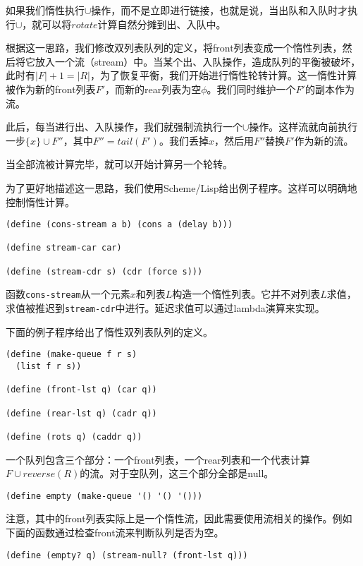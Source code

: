 \documentclass[UTF8]{article}
\begin{document}
如果我们惰性执行$\cup$操作，而不是立即进行链接，也就是说，当出队和入队时才执行$\cup$，就可以将$rotate$计算自然分摊到出、入队中。

根据这一思路，我们修改双列表队列的定义，将front列表变成一个惰性列表，然后将它放入一个流（stream）中\cite{SICP}。当某个出、入队操作，造成队列的平衡被破坏，此时有$|F| + 1 = |R|$，为了恢复平衡，我们开始进行惰性轮转计算。这一惰性计算被作为新的front列表$F'$，而新的rear列表为空$\phi$。我们同时维护一个$F'$的副本作为流。

此后，每当进行出、入队操作，我们就强制流执行一个$\cup$操作。这样流就向前执行一步$ \{ x \} \cup F''$，其中$F'' = tail(F')$。我们丢掉$x$，然后用$F''$替换$F'$作为新的流。

当全部流被计算完毕，就可以开始计算另一个轮转。

为了更好地描述这一思路，我们使用Scheme/Lisp给出例子程序。这样可以明确地控制惰性计算。

\lstset{language=Lisp}
\begin{lstlisting}
(define (cons-stream a b) (cons a (delay b)))

(define stream-car car)

(define (stream-cdr s) (cdr (force s)))
\end{lstlisting}

函数\texttt{cons-stream}从一个元素$x$和列表$L$构造一个惰性列表。它并不对列表$L$求值，求值被推迟到\texttt{stream-cdr}中进行。延迟求值可以通过lambda演算来实现\cite{SICP}。

下面的例子程序给出了惰性双列表队列的定义。

\lstset{language=Lisp}
\begin{lstlisting}
(define (make-queue f r s)
  (list f r s))

(define (front-lst q) (car q))

(define (rear-lst q) (cadr q))

(define (rots q) (caddr q))
\end{lstlisting}

一个队列包含三个部分：一个front列表，一个rear列表和一个代表计算$F \cup reverse(R)$的流。对于空队列，这三个部分全部是null。

\begin{lstlisting}
(define empty (make-queue '() '() '()))
\end{lstlisting}

注意，其中的front列表实际上是一个惰性流，因此需要使用流相关的操作。例如下面的函数通过检查front流来判断队列是否为空。

\begin{lstlisting}
(define (empty? q) (stream-null? (front-lst q)))
\end{lstlisting}
\end{document}
